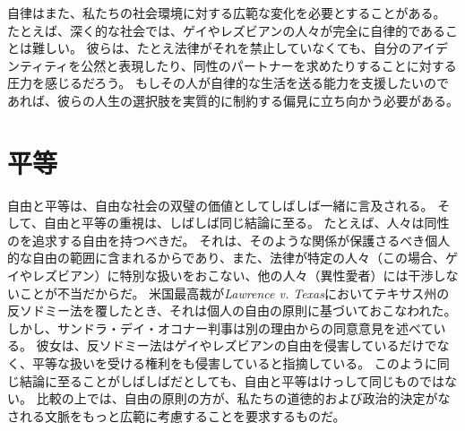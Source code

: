 \documentclass[paper=a4,book,openany]{jlreq}
\begin{document}
自律はまた、私たちの社会環境に対する広範な変化を必要とすることがある。
たとえば、深く的な社会では、ゲイやレズビアンの人々が完全に自律的であることは難しい。
彼らは、たとえ法律がそれを禁止していなくても、自分のアイデンティティを公然と表現したり、同性のパートナーを求めたりすることに対する圧力を感じるだろう。
もしその人が自律的な生活を送る能力を支援したいのであれば、彼らの人生の選択肢を実質的に制約する偏見に立ち向かう必要がある。

\section{平等}

自由と平等は、自由な社会の双璧の価値としてしばしば一緒に言及される。
そして、自由と平等の重視は、しばしば同じ結論に至る。
たとえば、人々は同性のを追求する自由を持つべきだ。
それは、そのような関係が保護さるべき個人的な自由の範囲に含まれるからであり、また、法律が特定の人々（この場合、ゲイやレズビアン）に特別な扱いをおこない、他の人々（異性愛者）には干渉しないことが不当だからだ。
米国最高裁が\emph{Lawrence v. Texas}においてテキサス州の反ソドミー法を覆したとき、それは個人の自由の原則に基づいておこなわれた。
しかし、サンドラ・デイ・オコナー判事は別の理由からの同意意見を述べている。
彼女は、反ソドミー法はゲイやレズビアンの自由を侵害しているだけでなく、平等な扱いを受ける権利をも侵害していると指摘している。
このように同じ結論に至ることがしばしばだとしても、自由と平等はけっして同じものではない。
比較の上では、自由の原則の方が、私たちの道徳的および政治的決定がなされる文脈をもっと広範に考慮することを要求するものだ。
\end{document}

